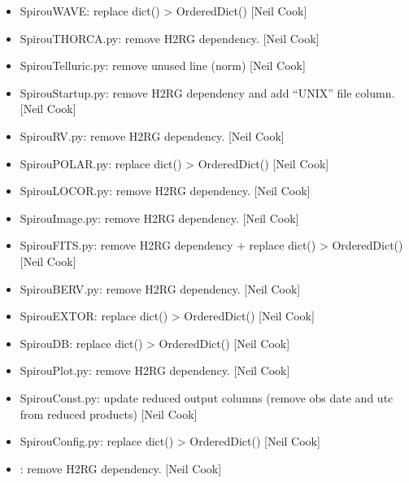 \documentclass[a4paper,10pt,english]{report}
\begin{document}
\begin{itemize}
\item {} 
SpirouWAVE: replace dict() \textendash{}\textgreater{} OrderedDict() {[}Neil Cook{]}

\item {} 
SpirouTHORCA.py: remove H2RG dependency. {[}Neil Cook{]}

\item {} 
SpirouTelluric.py: remove unused line (norm) {[}Neil Cook{]}

\item {} 
SpirouStartup.py: remove H2RG dependency and add “UNIX” file column.
{[}Neil Cook{]}

\item {} 
SpirouRV.py: remove H2RG dependency. {[}Neil Cook{]}

\item {} 
SpirouPOLAR.py: replace dict() \textendash{}\textgreater{} OrderedDict() {[}Neil Cook{]}

\item {} 
SpirouLOCOR.py: remove H2RG dependency. {[}Neil Cook{]}

\item {} 
SpirouImage.py: remove H2RG dependency. {[}Neil Cook{]}

\item {} 
SpirouFITS.py: remove H2RG dependency + replace dict() \textendash{}\textgreater{}
OrderedDict() {[}Neil Cook{]}

\item {} 
SpirouBERV.py: remove H2RG dependency. {[}Neil Cook{]}

\item {} 
SpirouEXTOR: replace dict() \textendash{}\textgreater{} OrderedDict() {[}Neil Cook{]}

\item {} 
SpirouDB: replace dict() \textendash{}\textgreater{} OrderedDict() {[}Neil Cook{]}

\item {} 
SpirouPlot.py: remove H2RG dependency. {[}Neil Cook{]}

\item {} 
SpirouConst.py: update reduced output columns (remove obs date and utc
from reduced products) {[}Neil Cook{]}

\item {} 
SpirouConfig.py: replace dict() \textendash{}\textgreater{} OrderedDict() {[}Neil Cook{]}

\item {} 
: remove H2RG dependency. {[}Neil Cook{]}


\end{itemize}
\end{document}

